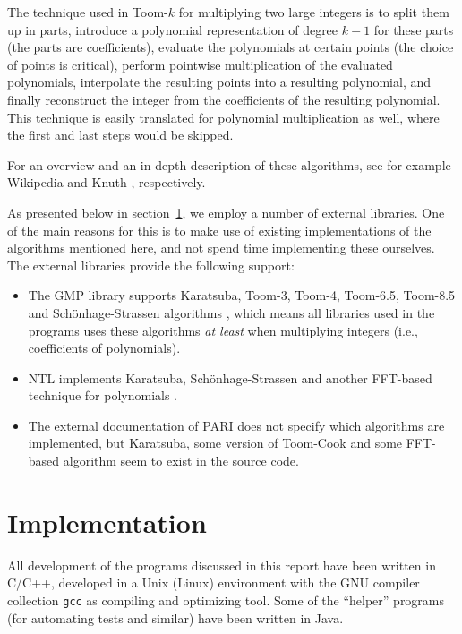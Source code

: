 \documentclass{cslthse-msc}
\newcommand{\code}{\texttt}
\begin{document}
The technique used in Toom-$k$ for multiplying two large integers is to split them up in parts, introduce a polynomial representation of degree $k-1$ for these parts (the parts are coefficients), evaluate the polynomials at certain points (the choice of points is critical), perform pointwise multiplication of the evaluated polynomials, interpolate the resulting points into a resulting polynomial, and finally reconstruct the integer from the coefficients of the resulting polynomial. This technique is easily translated for polynomial multiplication as well, where the first and last steps would be skipped.

For an overview and an in-depth description of these algorithms, see for example Wikipedia \cite{strass} \cite{toom-cook} and Knuth \cite[sec. 4.3.3]{knuth2}, respectively.

As presented below in section~\ref{implementation}, we employ a number of external libraries. One of the main reasons for this is to make use of existing implementations of the algorithms mentioned here, and not spend time implementing these ourselves. The external libraries provide the following support:

\begin{itemize}
 \item The GMP library supports Karatsuba, Toom-3, Toom-4, Toom-6.5, Toom-8.5 and Schönhage-Strassen algorithms \cite[p. 90]{gmp}, which means all libraries used in the programs uses these algorithms \emph{at least} when multiplying integers (i.e., coefficients of polynomials).
 \item NTL implements Karatsuba, Schönhage-Strassen and another FFT-based technique for polynomials \cite{ntl_zzx}.
 \item The external documentation of PARI does not specify which algorithms are implemented, but Karatsuba, some version of Toom-Cook and some FFT-based algorithm seem to exist in the source code.
\end{itemize}

\section{Implementation}\label{implementation}
All development of the programs discussed in this report have been written in C/C++, developed in a Unix (Linux) environment with the GNU compiler collection \code{gcc} as compiling and optimizing tool. Some of the ``helper'' programs (for automating tests and similar) have been written in Java.
\end{document}

